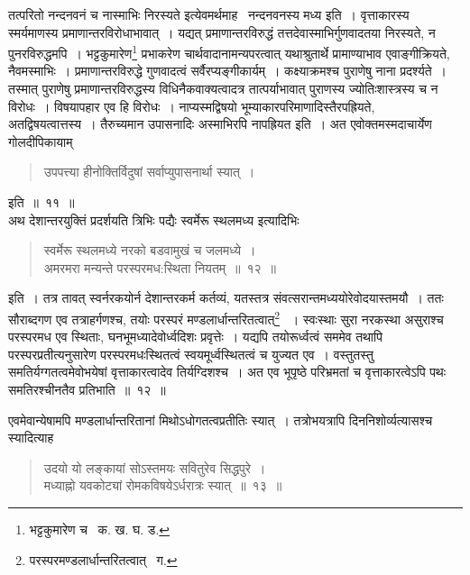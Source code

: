 \documentclass[11pt, openany]{book}
\begin{document}
\newpage

\noindent तत्परितो नन्दनवनं च नास्माभिः निरस्यते इत्येवमर्थमाह \textendash\ नन्दनवनस्य मध्य इति~। वृत्ताकारस्य स्मर्यमाणस्य प्रमाणान्तरविरोधाभावात्~। यद्यत् प्रमाणान्तरविरुद्धं तत्तदेवास्माभिर्गुणवादतया निरस्यते, न पुनरविरुद्धमपि~। भट्टकुमारेण\renewcommand{\thefootnote}{१}\footnote{भट्टकुमारेण च \textendash\ क. ख. घ. ड.} प्रभाकरेण 
चार्थवादानामन्यपरत्वात् यथाश्रुतार्थे प्रामाण्याभाव एवाङ्गीक्रियते, नैवमस्माभिः~। प्रमाणान्तरविरुद्धे गुणवादत्वं सर्वैरप्यङ्गीकार्यम्~। कक्ष्याक्रमश्च पुराणेषु नाना प्रदर्श्यते~। तस्मात् पुराणेषु प्रमाणान्तरविरुद्धस्य विधिनैकवाक्यत्वादत्र तात्पर्याभावात् पुराणस्य ज्योतिःशास्त्रस्य च न विरोधः~। 
विषयापहार एव हि विरोधः~। नाप्यस्मद्विषयो भूम्याकारपरिमाणादिस्तैरपह्रियते, अतद्विषयत्वात्तस्य~। तैरुच्यमान उपासनादिः अस्माभिरपि नापह्रियत इति~। अत एवोक्तमस्मदाचार्येण गोलदीपिकायाम्\textendash 

\begin{quote}
{\qt उपपत्त्या हीनोक्तिर्विदुषां सर्वाप्युपासनार्था स्यात्~। }
\end{quote} 
इति~॥~११~॥ \\

\indent अथ देशान्तरयुक्तिं प्रदर्शयति त्रिभिः पद्यैः स्वर्मेरू स्थलमध्य इत्यादिभिः\textendash  

\begin{quote}
{\ab स्वर्मेरू स्थलमध्ये नरको बडवामुखं च जलमध्ये~। \\
अमरमरा मन्यन्ते परस्परमध:स्थिता नियतम्~॥~१२~॥}
\end{quote}

\indent इति~। तत्र तावत् स्वर्नरकयोर्न देशान्तरकर्म कर्तव्यं, यतस्तत्र संवत्सरान्तमध्ययोरेवोदयास्तमयौ~। ततः सौराब्दगण एव 
तत्राहर्गणश्च, तयोः परस्परं मण्डलार्धान्तरितत्वात्\renewcommand{\thefootnote}{२}\footnote{परस्परमण्डलार्धान्तरितत्वात् \textendash\ ग.} ~। स्वःस्थाः सुरा नरकस्था	असुराश्च परस्परमध एव स्थिताः, घनभूमध्यादेवोर्ध्वदिशः प्रवृत्तेः~। यद्यपि तयोरूर्ध्वत्वं सममेव तथापि परस्परप्रतीत्यनुसारेण परस्परमधःस्थितत्वं स्वयमूर्ध्वस्थितत्वं च युज्यत एव~। वस्तुतस्तु समतिर्यग्गतत्वमेवोभयेषां वृत्ताकारत्वादेव तिर्यग्दिशश्च~। अत एव भूपृष्ठे परिभ्रमतां च वृत्ताकारत्वेऽपि पथः समतिरश्चीनतैव प्रतिभाति~॥~१२~॥ 

\newpage

\indent एवमेवान्येषामपि मण्डलार्धान्तरितानां मिथोऽधोगतत्वप्रतीतिः स्यात्~। तत्रोभयत्रापि दिननिशोर्व्यत्यासश्च स्यादित्याह\textendash  

\begin{quote}
{\ab उदयो यो लङ्कायां सोऽस्तमयः सवितुरेव सिद्धपुरे~। \\
 मध्याह्नो यवकोट्यां रोमकविषयेऽर्धरात्रः स्यात्~॥~१३~॥} 
\end{quote}
\end{document}
